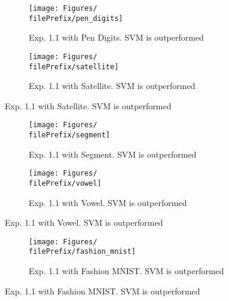 \begin{figure}[ht]
  \centering
  \begin{subfigure}[t]{0.5\linewidth}
    \centering\captionsetup{width=.8\linewidth}\texttt{[image: Figures/\\filePrefix/pen\_digits]}
    \caption{Exp. 1.1 with Pen Digits. SVM is outperformed}
    \label{fig:\undPrefix_pen_digits}
  \end{subfigure}%
  \begin{subfigure}[t]{0.5\linewidth}
    \centering\captionsetup{width=.8\linewidth}\texttt{[image: Figures/\\filePrefix/satellite]}
    \caption{Exp. 1.1 with Satellite. SVM is outperformed}
    \label{fig:\undPrefix_satellite}
  \end{subfigure}
\end{figure}

\begin{figure}[ht]
  \centering
  \begin{subfigure}[t]{0.5\linewidth}
    \centering\captionsetup{width=.8\linewidth}
    \texttt{[image: Figures/\\filePrefix/segment]}
    \caption{Exp. 1.1 with Segment. SVM is outperformed}
    \label{fig:\undPrefix_segment}
  \end{subfigure}%
  \begin{subfigure}[t]{0.5\linewidth}
    \centering\captionsetup{width=.8\linewidth}
    \texttt{[image: Figures/\\filePrefix/vowel]}
    \caption{Exp. 1.1 with Vowel. SVM is outperformed}
    \label{fig:\undPrefix_vowel}
  \end{subfigure}
\end{figure}

\begin{figure}[ht]
  \centering
  \begin{subfigure}[t]{0.5\linewidth}
    \centering\captionsetup{width=.8\linewidth}
    \texttt{[image: Figures/\\filePrefix/fashion\_mnist]}
    \caption{Exp. 1.1 with Fashion MNIST. SVM is outperformed}
    \label{fig:\undPrefix_fashion_mnist}
  \end{subfigure}%
\end{figure}


\let\major\undefined
\let\minor\undefined

\let\undPrefix\undefined
\let\dotPrefix\undefined
\let\scoPrefix\undefined

\let\filePrefix\undefined
